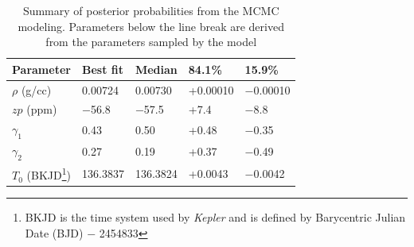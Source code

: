 \documentclass[apjl]{emulateapj}
\begin{document}
\begin{table}
\caption{Summary of posterior probabilities from the MCMC modeling. Parameters below the line break are derived from the parameters sampled by the model}\label{tab:results}
\begin{tabular}{l l l l l}
Parameter&Best fit& Median&84.1\%&15.9\%\\
\hline
%
$\rho$ (g/cc)			&	0.00724		&	0.00730		&	+0.00010		&	$-$0.00010	\\
$zp$	(ppm)			&	$-$56.8		&	$-$57.5		&	+7.4			&	$-$8.8		\\
$\gamma_1$			&	0.43			&	0.50			&	+0.48		&	$-$0.35		\\
$\gamma_2$			&	0.27			&	0.19			&	+0.37		&	$-$0.49		\\
$T_0$ (BKJD\footnote{BKJD is the time system used by \emph{Kepler} and is defined by Barycentric Julian Date (BJD) $-$ 2454833}) 	&	136.3837		&	136.3824		&	+0.0043		&	$-$0.0042		\\

\end{tabular}
\end{table}
\end{document}
